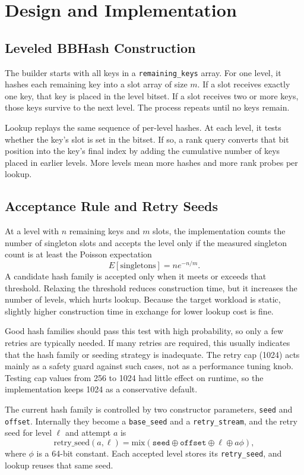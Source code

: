 \documentclass[10pt]{article}
\begin{document}
\section{Design and Implementation}
\subsection{Leveled BBHash Construction}
The builder starts with all keys in a \texttt{remaining\_keys} array. For one level, it hashes each remaining key into a slot array of size $m$. If a slot receives exactly one key, that key is placed in the level bitset. If a slot receives two or more keys, those keys survive to the next level. The process repeats until no keys remain.

Lookup replays the same sequence of per-level hashes. At each level, it tests whether the key's slot is set in the bitset. If so, a rank query converts that bit position into the key's final index by adding the cumulative number of keys placed in earlier levels. More levels mean more hashes and more rank probes per lookup.

\subsection{Acceptance Rule and Retry Seeds}
At a level with $n$ remaining keys and $m$ slots, the implementation counts the number of singleton slots and accepts the level only if the measured singleton count is at least the Poisson expectation
\[
E[\mathrm{singletons}] = n e^{-n/m}.
\]
A candidate hash family is accepted only when it meets or exceeds that threshold. Relaxing the threshold reduces construction time, but it increases the number of levels, which hurts lookup. Because the target workload is static, slightly higher construction time in exchange for lower lookup cost is fine.

Good hash families should pass this test with high probability, so only a few retries are typically needed. If many retries are required, this usually indicates that the hash family or seeding strategy is inadequate. The retry cap (1024) acts mainly as a safety guard against such cases, not as a performance tuning knob. Testing cap values from 256 to 1024 had little effect on runtime, so the implementation keeps 1024 as a conservative default.

The current hash family is controlled by two constructor parameters, \texttt{seed} and \texttt{offset}. Internally they become a \texttt{base\_seed} and a \texttt{retry\_stream}, and the retry seed for level $\ell$ and attempt $a$ is
\[
\mathrm{retry\_seed}(a,\ell) = \mathrm{mix}(\texttt{seed} \oplus \texttt{offset} \oplus \ell \oplus a\phi),
\]
where $\phi$ is a 64-bit constant. Each accepted level stores its \texttt{retry\_seed}, and lookup reuses that same seed.
\end{document}
